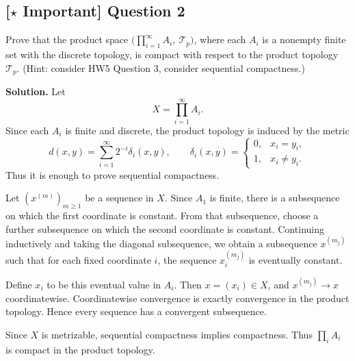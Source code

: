 \documentclass{article}
\newcommand{\important}{\texorpdfstring{\textbf{[\(\star\) Important]}}{[Important]}}
\newenvironment{solution}{\par\noindent\textbf{Solution.}\quad}{\par}
\begin{document}
\subsection{\important{} Question 2}
Prove that the product space $\bigl(\prod_{i=1}^{\infty} A_i,\ \mathcal{T}_p\bigr)$, where each $A_i$ is a nonempty finite set with the discrete topology, is compact with respect to the product topology $\mathcal{T}_p$. (Hint: consider HW5 Question 3, consider sequential compactness.)

\begin{solution}
Let
\[
  X=\prod_{i=1}^{\infty}A_i.
\]
Since each $A_i$ is finite and discrete, the product topology is induced by
the metric
\[
  d(x,y)=\sum_{i=1}^{\infty}2^{-i}\delta_i(x,y),
  \qquad
  \delta_i(x,y)=
  \begin{cases}
    0,&x_i=y_i,\\
    1,&x_i\ne y_i.
  \end{cases}
\]
Thus it is enough to prove sequential compactness.

Let $(x^{(m)})_{m\ge1}$ be a sequence in $X$. Since $A_1$ is finite, there
is a subsequence on which the first coordinate is constant. From that
subsequence, choose a further subsequence on which the second coordinate is
constant. Continuing inductively and taking the diagonal subsequence, we
obtain a subsequence $x^{(m_j)}$ such that for each fixed coordinate $i$,
the sequence $x_i^{(m_j)}$ is eventually constant.

Define $x_i$ to be this eventual value in $A_i$. Then
$x=(x_i)\in X$, and $x^{(m_j)}\to x$ coordinatewise. Coordinatewise
convergence is exactly convergence in the product topology. Hence every
sequence has a convergent subsequence.

Since $X$ is metrizable, sequential compactness implies compactness. Thus
$\prod_i A_i$ is compact in the product topology.
\end{solution}
\end{document}
